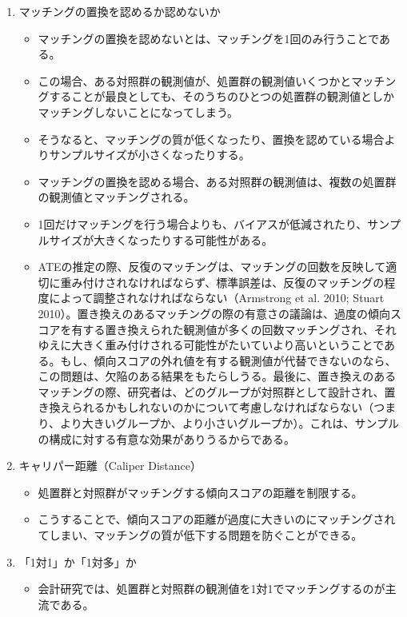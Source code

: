 \begin{enumerate}
 \item マッチングの置換を認めるか認めないか
   \begin{itemize}
    \item マッチングの置換を認めないとは、マッチングを1回のみ行うことである。
    \item この場合、ある対照群の観測値が、処置群の観測値いくつかとマッチングすることが最良としても、そのうちのひとつの処置群の観測値としかマッチングしないことになってしまう。
    \item そうなると、マッチングの質が低くなったり、置換を認めている場合よりサンプルサイズが小さくなったりする。
    \item マッチングの置換を認める場合、ある対照群の観測値は、複数の処置群の観測値とマッチングされる。
    \item 1回だけマッチングを行う場合よりも、バイアスが低減されたり、サンプルサイズが大きくなったりする可能性がある。
    \item ATEの推定の際、反復のマッチングは、マッチングの回数を反映して適切に重み付けされなければならず、標準誤差は、反復のマッチングの程度によって調整されなければならない（Armstrong et al. 2010; Stuart 2010）。置き換えのあるマッチングの際の有意さの議論は、過度の傾向スコアを有する置き換えられた観測値が多くの回数マッチングされ、それゆえに大きく重み付けされる可能性がたいていより高いということである。もし、傾向スコアの外れ値を有する観測値が代替できないのなら、この問題は、欠陥のある結果をもたらしうる。最後に、置き換えのあるマッチングの際、研究者は、どのグループが対照群として設計され、置き換えられるかもしれないのかについて考慮しなければならない（つまり、より大きいグループか、より小さいグループか）。これは、サンプルの構成に対する有意な効果がありうるからである。
   \end{itemize}
 \item キャリパー距離（Caliper Distance）
   \begin{itemize}
    \item 処置群と対照群がマッチングする傾向スコアの距離を制限する。
    \item こうすることで、傾向スコアの距離が過度に大きいのにマッチングされてしまい、マッチングの質が低下する問題を防ぐことができる。
   \end{itemize}
 \item 「1対1」か「1対多」か
   \begin{itemize}
    \item 会計研究では、処置群と対照群の観測値を1対1でマッチングするのが主流である。

\end{itemize}
\end{enumerate}
